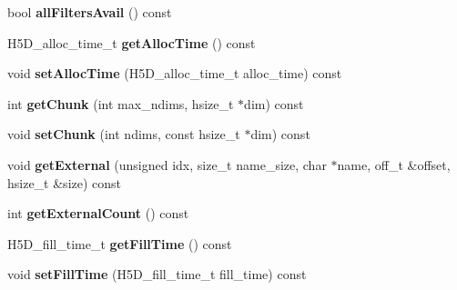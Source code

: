\begin{DoxyCompactItemize}
bool {\bfseries all\+Filters\+Avail} () const
\item 
\mbox{\label{class_h5_1_1_d_set_creat_prop_list_a50afbd767f718afaf4d047daaad60d22}} 
H5\+D\+\_\+alloc\+\_\+time\+\_\+t {\bfseries get\+Alloc\+Time} () const
\item 
\mbox{\label{class_h5_1_1_d_set_creat_prop_list_a7d28e947173c3449061f162a24c77713}} 
void {\bfseries set\+Alloc\+Time} (H5\+D\+\_\+alloc\+\_\+time\+\_\+t alloc\+\_\+time) const
\item 
\mbox{\label{class_h5_1_1_d_set_creat_prop_list_a0548525ce9a6ca046a1e29143597b5e3}} 
int {\bfseries get\+Chunk} (int max\+\_\+ndims, hsize\+\_\+t $\ast$dim) const
\item 
\mbox{\label{class_h5_1_1_d_set_creat_prop_list_ad6ef1bf35feae7e5c08f4ea734b6db38}} 
void {\bfseries set\+Chunk} (int ndims, const hsize\+\_\+t $\ast$dim) const
\item 
\mbox{\label{class_h5_1_1_d_set_creat_prop_list_ad459cacb6070efad38715eca9384902a}} 
void {\bfseries get\+External} (unsigned idx, size\+\_\+t name\+\_\+size, char $\ast$name, off\+\_\+t \&offset, hsize\+\_\+t \&size) const
\item 
\mbox{\label{class_h5_1_1_d_set_creat_prop_list_ac7c9d55d726c724b7b8484f9ab6e2f52}} 
int {\bfseries get\+External\+Count} () const
\item 
\mbox{\label{class_h5_1_1_d_set_creat_prop_list_a1028d3865cb6eaee54a53fcc6fffffe7}} 
H5\+D\+\_\+fill\+\_\+time\+\_\+t {\bfseries get\+Fill\+Time} () const
\item 
\mbox{\label{class_h5_1_1_d_set_creat_prop_list_a084923c077a3ef60b78808df5a1f6391}} 
void {\bfseries set\+Fill\+Time} (H5\+D\+\_\+fill\+\_\+time\+\_\+t fill\+\_\+time) const
\item 
\mbox{\label{class_h5_1_1_d_set_creat_prop_list_a89fae7f23682c7ebbd47e75a2e7ee8dc}} 

\end{DoxyCompactItemize}
